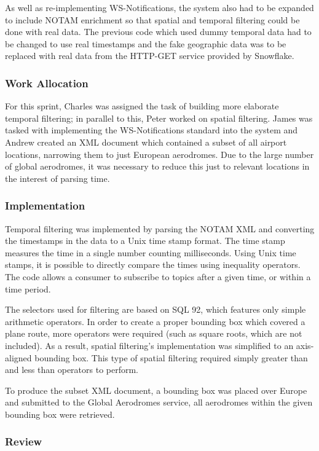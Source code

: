 \documentclass[a4paper, 12pt, twoside]{article}
\begin{document}
As well as re-implementing WS-Notifications, the system also had to be expanded to include NOTAM enrichment so that spatial and temporal filtering could be done with real data. The previous code which used dummy temporal data had to be changed to use real timestamps and the fake geographic data was to be replaced with real data from the HTTP-GET service provided by Snowflake.

\subsubsection{Work Allocation}

For this sprint, Charles was assigned the task of building more elaborate temporal filtering; in parallel to this, Peter worked on spatial filtering. James was tasked with implementing the WS-Notifications standard into the system and Andrew created an XML document which contained a subset of all airport locations, narrowing them to just European aerodromes. Due to the large number of global aerodromes, it was necessary to reduce this just to relevant locations in the interest of parsing time.

\subsubsection{Implementation}

Temporal filtering was implemented by parsing the NOTAM XML and converting the timestamps in the data to a Unix time stamp format. The time stamp measures the time in a single number counting milliseconds. Using Unix time stamps, it is possible to directly compare the times using inequality operators. The code allows a consumer to subscribe to topics after a given time, or within a time period.

The selectors used for filtering are based on SQL 92, which features only simple arithmetic operators. In order to create a proper bounding box which covered a plane route, more operators were required (such as square roots, which are not included). As a result, spatial filtering's implementation was simplified to an axis-aligned bounding box. This type of spatial filtering required simply greater than and less than operators to perform.

To produce the subset XML document, a bounding box was placed over Europe and submitted to the Global Aerodromes service, all aerodromes within the given bounding box were retrieved.

\subsubsection{Review}
\end{document}
